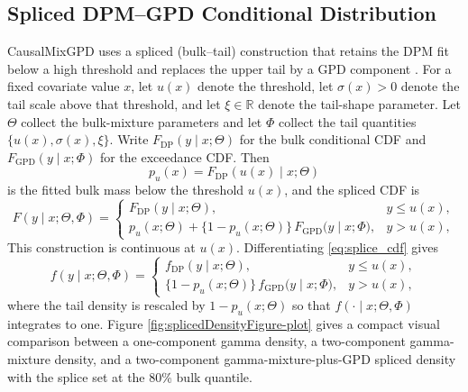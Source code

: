 \documentclass[article]{jss}\usepackage[]{graphicx}\usepackage[]{xcolor}
\DeclareRobustCommand{\pkg}[1]{\textsf{#1}}
\begin{document}
\subsection{Spliced DPM--GPD Conditional Distribution}
\label{subsec:splice}

\pkg{CausalMixGPD} uses a spliced (bulk--tail) construction that retains
the DPM fit below a high threshold and replaces the upper tail by a GPD
component \citep{Frigessi2002,Behrens2004,Coles2001}. For a fixed
covariate value $x$, let $u(x)$ denote the threshold, let
$\sigma(x)>0$ denote the tail scale above that threshold, and let
$\xi\in\mathbb{R}$ denote the tail-shape parameter. Let $\Theta$
collect the bulk-mixture parameters and let $\Phi$ collect the tail
quantities $\{u(x),\sigma(x),\xi\}$. Write
$F_{\mathrm{DP}}(y\mid x;\Theta)$ for the bulk conditional CDF and
$F_{\mathrm{GPD}}(y\mid x;\Phi)$ for the exceedance CDF. Then
\begin{equation}
p_u(x)=F_{\mathrm{DP}}(u(x)\mid x;\Theta)
\label{eq:pu_theta}
\end{equation}
is the fitted bulk mass below the threshold $u(x)$, and the spliced CDF
is
\begin{equation}
F(y\mid x;\Theta,\Phi)=
\begin{cases}
F_{\mathrm{DP}}(y\mid x;\Theta), & y \le u(x),\\[6pt]
p_u(x;\Theta)
+
\bigl\{1-p_u(x;\Theta)\bigr\}\,
F_{\mathrm{GPD}}\!\bigl(y\mid x;\Phi\bigr),
& y>u(x),
\end{cases}
\label{eq:splice_cdf}
\end{equation}
This construction is continuous at $u(x)$. Differentiating
\eqref{eq:splice_cdf} gives
\begin{equation}
f(y\mid x;\Theta,\Phi)=
\begin{cases}
f_{\mathrm{DP}}(y\mid x;\Theta), & y \le u(x),\\[8pt]
\bigl\{1-p_u(x;\Theta)\bigr\}\,
f_{\mathrm{GPD}}\!\bigl(y\mid x;\Phi\bigr),
& y>u(x),
\end{cases}
\label{eq:splice_pdf}
\end{equation}
where the tail density is rescaled by $1-p_u(x;\Theta)$ so that
$f(\cdot\mid x;\Theta,\Phi)$ integrates to one. Figure
\ref{fig:splicedDensityFigure-plot} gives a compact visual comparison
between a one-component gamma density, a two-component gamma-mixture
density, and a two-component gamma-mixture-plus-GPD spliced density
with the splice set at the 80\% bulk quantile.
\end{document}
